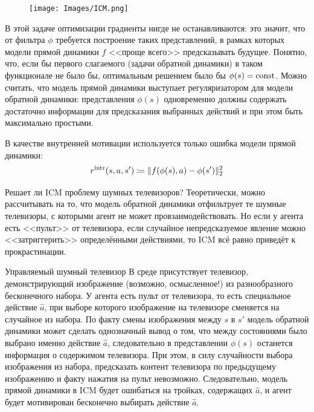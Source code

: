 \begin{figure}
\vspace{-0.4cm}
\centering
\texttt{[image: Images/ICM.png]}
\vspace{-0.5cm}
\end{figure}

В этой задаче оптимизации градиенты нигде не останавливаются: это значит, что от фильтра $\phi$ требуется построение таких представлений, в рамках которых модели прямой динамики $f$ <<проще всего>> предсказывать будущее. Понятно, что, если бы первого слагаемого (задачи обратной динамики) в таком функционале не было бы, оптимальным решением было бы $\phi(s) \HM= \const$. Можно считать, что модель прямой динамики выступает регуляризатором для модели обратной динамики: представления $\phi(s)$ одновременно должны содержать достаточно информации для предсказания выбранных действий и при этом быть максимально простыми.

В качестве внутренней мотивации используется только ошибка модели прямой динамики:
\begin{equation*}
r^{\mathrm{intr}}(s, a, s') \coloneqq \|f(\phi(s), a) - \phi(s')\|^2_2
\end{equation*}

Решает ли ICM проблему шумных телевизоров? Теоретически, можно рассчитывать на то, что модель обратной динамики отфильтрует те шумные телевизоры, с которыми агент не может провзаимодействовать. Но если у агента есть <<пульт>> от телевизора, если случайное непредсказуемое явление можно <<затриггерить>> определёнными действиями, то ICM всё равно приведёт к прокрастинации.

\begin{exampleBox}[label=ex:controltv]{Управляемый шумный телевизор}
В среде присутствует телевизор, демонстрирующий изображение (возможно, осмысленное!) из разнообразного бесконечного набора. У агента есть пульт от телевизора, то есть специальное действие $\hat{a}$, при выборе которого изображение на телевизоре сменяется на случайное из набора. По факту смены изображения между $s$ в $s'$ модель обратной динамики может сделать однозначный вывод о том, что между состояниями было выбрано именно действие $\hat{a}$, следовательно в представлении $\phi(s)$ останется информация о содержимом телевизора. При этом, в силу случайности выбора изображения из набора, предсказать контент телевизора по предыдущему изображению и факту нажатия на пульт невозможно. Следовательно, модель прямой динамики в ICM будет ошибаться на тройках, содержащих $\hat{a}$, и агент будет мотивирован бесконечно выбирать действие $\hat{a}$.
\end{exampleBox}


